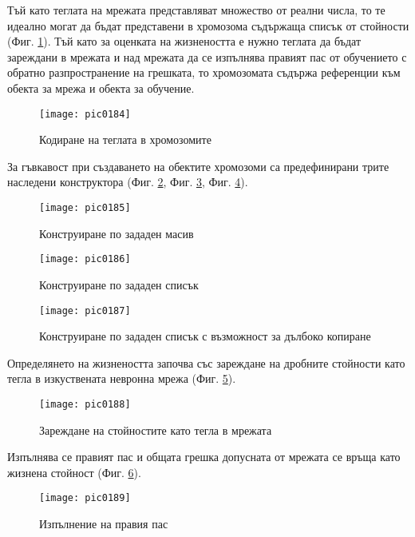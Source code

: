 Тъй като теглата на мрежата представляват множество от реални числа, то те идеално могат да бъдат представени в хромозома съдържаща списък от стойности (Фиг. \ref{fig:pic0184}). Тъй като за оценката на жизнеността е нужно теглата да бъдат зареждани в мрежата и над мрежата да се изпълнява правият пас от обучението с обратно разпространение на грешката, то хромозомата съдържа референции към обекта за мрежа и обекта за обучение. 

\begin{figure}[h]
  \centering
  \texttt{[image: pic0184]}
  \caption{Кодиране на теглата в хромозомите}
\label{fig:pic0184}
\end{figure}
\FloatBarrier

За гъвкавост при създаването на обектите хромозоми са предефинирани трите наследени конструктора (Фиг. \ref{fig:pic0185}, Фиг. \ref{fig:pic0186}, Фиг. \ref{fig:pic0187}).

\begin{figure}[h]
  \centering
  \texttt{[image: pic0185]}
  \caption{Конструиране по зададен масив}
\label{fig:pic0185}
\end{figure}
\FloatBarrier

\begin{figure}[h]
  \centering
  \texttt{[image: pic0186]}
  \caption{Конструиране по зададен списък}
\label{fig:pic0186}
\end{figure}
\FloatBarrier

\begin{figure}[h]
  \centering
  \texttt{[image: pic0187]}
  \caption{Конструиране по зададен списък с възможност за дълбоко копиране}
\label{fig:pic0187}
\end{figure}
\FloatBarrier

Определянето на жизнеността започва със зареждане на дробните стойности като тегла в изкуствената невронна мрежа (Фиг. \ref{fig:pic0188}).

\begin{figure}[h]
  \centering
  \texttt{[image: pic0188]}
  \caption{Зареждане на стойностите като тегла в мрежата}
\label{fig:pic0188}
\end{figure}
\FloatBarrier

Изпълнява се правият пас и общата грешка допусната от мрежата се връща като жизнена стойност (Фиг. \ref{fig:pic0189}).

\begin{figure}[h]
  \centering
  \texttt{[image: pic0189]}
  \caption{Изпълнение на правия пас}
\label{fig:pic0189}
\end{figure}
\FloatBarrier

